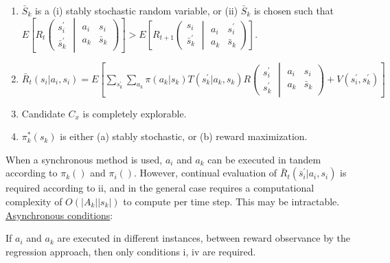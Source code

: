 \begin{enumerate}[label=\roman*$\cdot$]
\item $\bar{S}_k$ is a (i) stably stochastic random variable, or (ii) $\bar{S}_k$ is chosen such that $E\left[ R_t\left( \begin{array}{c} s^\prime_i \\ \bar{s}^\prime_k \end{array}  \middle| \begin{array}{cc} a_i & s_i \\ a_k & \bar{s}_k \end{array}\right) \right]>E\left[ R_{t+1}\left( \begin{array}{c} s_i \\ \bar{s}^\prime_k \end{array}  \middle| \begin{array}{cc} a_i & s^\prime_i \\ a_k & \bar{s}_k \end{array}\right) \right]$.
\item $\bar{R}_t( s_i | a_i, s_i ) = E\left[
  \sum_{s^\prime_k} \sum_{a_k} \pi( a_k | s_k ) T( s^\prime_k | a_k, s_k  )
    R\left(
           \begin{array}{c} s_i^\prime \\ s^\prime_k  \end{array} \middle| \begin{array}{cc} a_i & s_i \\ a_k & \bar{s}_k  \end{array}
     \right)
  + V\left( s_i^\prime, s_k^\prime
     \right)
     \right]$
\item Candidate $C_x$ is completely explorable.
\item $\pi^\ast_k( s_k )$ is either (a) stably stochastic, or (b) reward maximization.
\end{enumerate}
When a synchronous method is used, $a_i$ and $a_k$ can be executed in tandem according to $\pi_k()$ and $\pi_i()$. However, continual evaluation of $\bar{R}_t( \bar{s}^\prime_i | a_i, s_i )$ is required according to ii, and in the general case requires a computational complexity of $O\left( \left| A_k \right| \left| s_k \right| \right)$ to compute per time step. This may be intractable. \\

\underline{Asynchronous conditions}:

If $a_i$ and $a_k$ are executed in different instances, between reward observance by the regression approach, then only conditions i, iv are required. 

